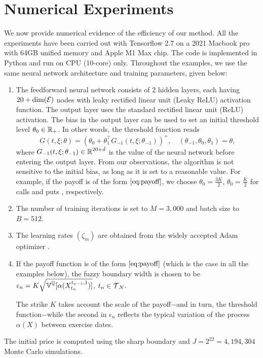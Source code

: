 \section{Numerical Experiments}

We now provide numerical evidence of the efficiency of our method. All the  experiments have been carried out  with Tensorflow 2.7  on a 2021 Macbook pro with 64GB unified memory and Apple M1 Max chip. The code is implemented in Python and run on CPU (10-core) only.  
Throughout the examples, we use the same neural network architecture and training parameters,  given  below:
\begin{enumerate}
\item The feedforward neural network consists of $2$ hidden layers, each having $20 + \text{dim}(\operatorname{\mathcal{E}})$  nodes  with leaky rectified linear unit (Leaky ReLU) activation function. The output layer uses the standard rectified linear unit (ReLU)  activation. The  bias in the output layer can be used to set  an initial threshold level $\theta_0 \in \operatorname{\mathbb{R}}_+$.     In other words, the  threshold function reads
$$G(t,\xi; \theta) = \left(\theta_0 + \theta_1^{\top} G_{-1}(t,\xi; \theta_{-1})\right)^+, \quad (\theta_{-1}, \theta_{0}, \theta_1) = \theta, $$ %
where  $G_{-1}(t,\xi; \theta_{-1}) \in \operatorname{\mathbb{R}}^{20+\bar{d}}$ is the value of the neural network before entering the output layer. From our observations, the algorithm is not sensitive to the initial bias, as long as it is set to a reasonable value.  For example, if the payoff is of the form   $\eqref{eq:payoff}$, we  choose $\theta_0=\frac{3K}{2}$,  $\theta_0=\frac{K}{2}$ for  calls 
and puts
,  respectively. 

\item The number of training iterations is set to $M=3,000$ and batch size to $B = 512$. 
    \item The learning rates $(\zeta_m)$ are obtained from the widely accepted Adam optimizer \cite{Kingma}.
    
    \item  
    If the payoff function is of the form
    $\eqref{eq:payoff}$ (which is the case in all the examples below), the fuzzy boundary width is chosen to be    
    $\epsilon_n = K \sqrt{\operatorname{\mathbb{V}}^{\operatorname{\mathbb{Q}}}[ \alpha(X^{t_{n-1},1}_{t_n})]}$, $t_n \in \operatorname{\mathcal{T}}_N$. 

     The strike $K$ takes account the scale of the payoff$-$and in turn, the threshold function$-$while  the second in $\epsilon_n$ reflects the typical variation 
     of the  process $\alpha(X)$ between exercise dates.  
\end{enumerate}
The initial price is computed using the sharp boundary and $J= 2^{22} = 4,194,304$ Monte Carlo simulations. 

